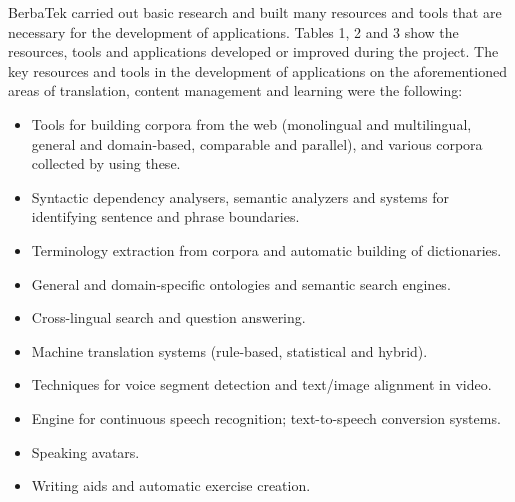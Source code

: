 \documentclass[output=paper]{LSP/langsci}
\begin{document}
BerbaTek carried out basic research and built many resources and tools that are necessary for the development of applications. Tables 1, 2 and 3 show the resources, tools and applications developed or improved during the project. The key resources and tools in the development of applications on the aforementioned areas of translation, content management and learning were the following:

\newpage
\begin{itemize}
\item  
Tools for building corpora from the web (monolingual and multilingual, general and domain-based, comparable and parallel), and various corpora collected by using these.
\item 
Syntactic dependency analysers, semantic analyzers and systems for identifying sentence and phrase boundaries.
\item 
Terminology extraction from corpora and automatic building of dictionaries.
\item  
General and domain-specific ontologies and semantic search engines.
\item  
Cross-lingual search and question answering.
\item 
Machine translation systems (rule-based, statistical and hybrid).
\item  
Techniques for voice segment detection and text/image alignment in video.
\item 
Engine for continuous speech recognition; text-to-speech conversion systems.
\item  Speaking avatars.
\item Writing aids and automatic exercise creation.
\end{itemize}
\newpage
\end{document}
